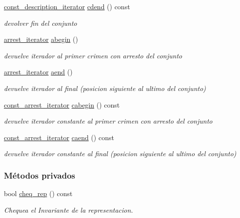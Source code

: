 \begin{DoxyCompactItemize}
\hyperlink{classconjunto_1_1const__description__iterator}{const\-\_\-description\-\_\-iterator} \hyperlink{classconjunto_a85880153408fe39d7e3679b3f8f1c4c2}{cdend} () const 
\begin{DoxyCompactList}\small\item\em devolver fin del conjunto \end{DoxyCompactList}\item 
\hyperlink{classconjunto_1_1arrest__iterator}{arrest\-\_\-iterator} \hyperlink{classconjunto_a856c87cf5b67237347baa1fb15d99397}{abegin} ()
\begin{DoxyCompactList}\small\item\em devuelve iterador al primer crimen con arresto del conjunto \end{DoxyCompactList}\item 
\hyperlink{classconjunto_1_1arrest__iterator}{arrest\-\_\-iterator} \hyperlink{classconjunto_ad1ae2bcfec7c3635055e5719c9b24bbc}{aend} ()
\begin{DoxyCompactList}\small\item\em devuelve iterador al final (posicion siguiente al ultimo del conjunto) \end{DoxyCompactList}\item 
\hyperlink{classconjunto_1_1const__arrest__iterator}{const\-\_\-arrest\-\_\-iterator} \hyperlink{classconjunto_a762c29450111896679a3720f28dd45ee}{cabegin} () const 
\begin{DoxyCompactList}\small\item\em devuelve iterador constante al primer crimen con arresto del conjunto \end{DoxyCompactList}\item 
\hyperlink{classconjunto_1_1const__arrest__iterator}{const\-\_\-arrest\-\_\-iterator} \hyperlink{classconjunto_af4cd3952cc7f21b50b70ecc0a9de2917}{caend} () const 
\begin{DoxyCompactList}\small\item\em devuelve iterador constante al final (posicion siguiente al ultimo del conjunto) \end{DoxyCompactList}\end{DoxyCompactItemize}
\subsubsection*{Métodos privados}
\begin{DoxyCompactItemize}
\item 
bool \hyperlink{classconjunto_adb0ff15cf65817b0b279bae4bf06decb}{cheq\-\_\-rep} () const 
\begin{DoxyCompactList}\small\item\em Chequea el Invariante de la representacion. \end{DoxyCompactList}\end{DoxyCompactItemize}
